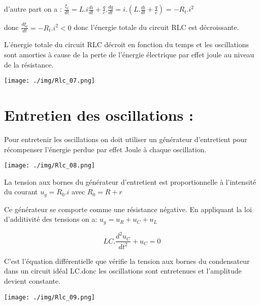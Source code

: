 \documentclass[12pt]{article}
\begin{document}
d'autre part on a : $\frac{\xi_t}{dt} = L.i\frac{di}{dt} + \frac{q}{c}.\frac{dq}{dt}= i.(L.\frac{di}{dt} + \frac{q}{c} ) = -R_t.i^2$

donc $\frac{d\xi_t}{dt} = -R_t.i^2  < 0$ donc l'énergie totale du circuit RLC est décroissante.

L'énergie totale du circuit RLC décroit en fonction du temps et les oscillations sont amorties à cause de la perte de
l'énergie électrique par effet joule au niveau de la résistance.

\begin{center}
	\texttt{[image: ./img/Rlc\_07.png]}
\end{center}


\section{Entretien des oscillations : }
Pour entretenir les oscillations on doit utiliser un générateur d'entretient pour récompenser l'énergie perdue par effet Joule à
chaque oscillation.

\begin{center}
	\texttt{[image: ./img/Rlc\_08.png]}
\end{center}




La tension aux bornes du générateur d'entretient est proportionnelle à l'intensité du courant $u_g = R_0.i$ avec $R_0 = R+r$

Ce générateur se comporte comme une résistance négative.
En appliquant la loi d'additivité des tensions on a: $u_g = u_R + u_C + u_L$

$$LC.\frac{d^2u_C}{dt^2} + u_C = 0$$

C'est l'équation différentielle que vérifie la tension aux bornes du condensateur dans un circuit idéal LC.donc les oscillations
sont entretenues et l'amplitude devient constante.

\begin{center}
	\texttt{[image: ./img/Rlc\_09.png]}
\end{center}




\end{document}
